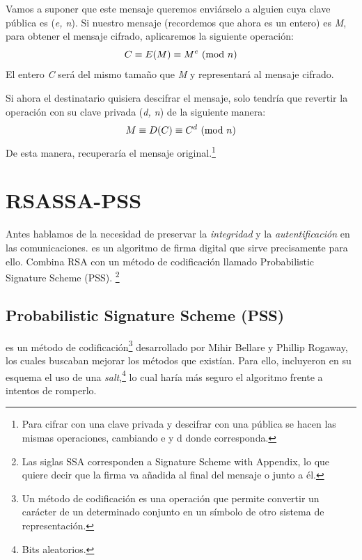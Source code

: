  Vamos a suponer que este mensaje queremos enviárselo a alguien cuya clave pública es (\emph{e, n}).
 Si nuestro mensaje (recordemos que ahora es un entero) es \emph{M}, para obtener el mensaje cifrado, aplicaremos la siguiente operación:
 \[ C \equiv E(M) \equiv M^e \ (\mathrm{mod}\ n) \]
 El entero \emph{C} será del mismo tamaño que \emph{M} y representará al mensaje cifrado.

 Si ahora el destinatario quisiera descifrar el mensaje, solo tendría que revertir la operación con su clave privada (\emph{d, n}) de la siguiente manera:
 \[ M \equiv D(C) \equiv C^d \ (\mathrm{mod}\ n) \]
 De esta manera, recuperaría el mensaje original.\footnote{Para cifrar con una clave privada y descifrar con una pública se hacen las mismas operaciones, cambiando e y d donde corresponda.} \emph{\parencite{Reference12}}


 \section{RSASSA-PSS}

 Antes hablamos de la necesidad de preservar la \emph{integridad} y la \emph{autentificación} en las comunicaciones.
  es un algoritmo de firma digital que sirve precisamente para ello.
 Combina RSA con un método de codificación llamado Probabilistic Signature Scheme (PSS).
 \footnote{Las siglas SSA corresponden a Signature Scheme with Appendix, lo que quiere decir que la firma va añadida al final del mensaje o junto a él.}

 \subsection{Probabilistic Signature Scheme (PSS)}

  es un método de codificación\footnote{Un método de codificación es una operación que permite convertir un carácter de un determinado conjunto en un símbolo de otro sistema de representación.}
 desarrollado por Mihir Bellare y Phillip Rogaway, los cuales buscaban mejorar los métodos que existían.
 Para ello, incluyeron en su esquema el uso de una \emph{salt},\footnote{Bits aleatorios.} lo cual haría más seguro el algoritmo frente a intentos de romperlo. \emph{\parencite{Reference15}}


